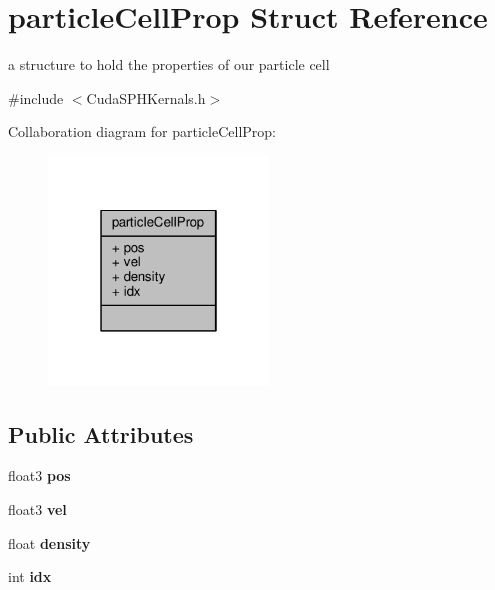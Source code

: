 \hypertarget{structparticle_cell_prop}{\section{particle\-Cell\-Prop Struct Reference}
\label{structparticle_cell_prop}
}


a structure to hold the properties of our particle cell  




{\ttfamily \#include $<$Cuda\-S\-P\-H\-Kernals.\-h$>$}



Collaboration diagram for particle\-Cell\-Prop\-:\nopagebreak
\begin{figure}[H]
\begin{center}
\leavevmode
\includegraphics[width=166pt]{structparticle_cell_prop__coll__graph}
\end{center}
\end{figure}
\subsection*{Public Attributes}
\begin{DoxyCompactItemize}
\item 
\hypertarget{structparticle_cell_prop_a016a16c8e3e05c845ff225c15737cf2e}{float3 {\bfseries pos}}\label{structparticle_cell_prop_a016a16c8e3e05c845ff225c15737cf2e}

\item 
\hypertarget{structparticle_cell_prop_a2a2e5a1e900a4ef5635a7967c0049df3}{float3 {\bfseries vel}}\label{structparticle_cell_prop_a2a2e5a1e900a4ef5635a7967c0049df3}

\item 
\hypertarget{structparticle_cell_prop_a27ad7b6527abe273b0e4eb1d91e9b71c}{float {\bfseries density}}\label{structparticle_cell_prop_a27ad7b6527abe273b0e4eb1d91e9b71c}

\item 
\hypertarget{structparticle_cell_prop_ac32e55524eadd3499ccb99c0d04ef557}{int {\bfseries idx}}\label{structparticle_cell_prop_ac32e55524eadd3499ccb99c0d04ef557}

\end{DoxyCompactItemize}


